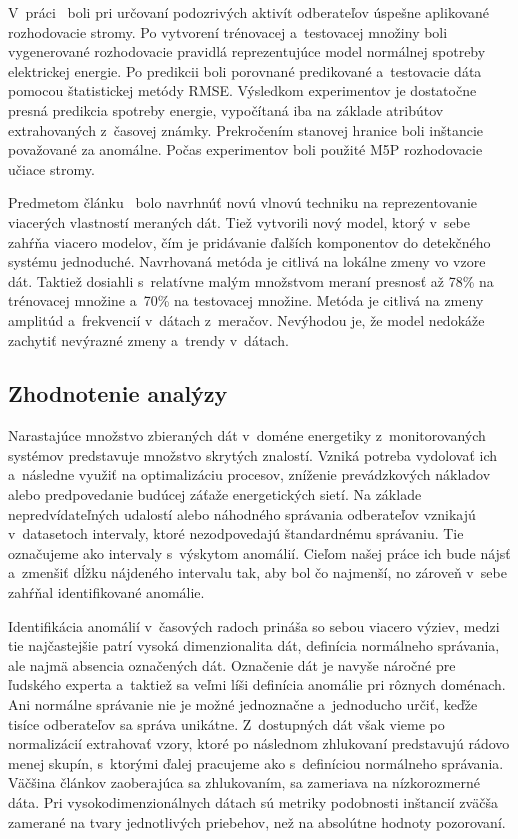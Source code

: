 \documentclass[a4paper,twoside,slovak,12pt,appendix]{article}
\begin{document}
\noindent
V~práci~\cite{Cody2015} boli pri určovaní podozrivých aktivít odberateľov
úspešne aplikované rozhodovacie stromy. Po vytvorení trénovacej a~testovacej
množiny boli vygenerované rozhodovacie pravidlá reprezentujúce model normálnej
spotreby elektrickej energie. Po predikcii boli porovnané predikované
a~testovacie dáta pomocou štatistickej metódy RMSE. Výsledkom experimentov je
dostatočne presná predikcia spotreby energie, vypočítaná iba na základe
atribútov extrahovaných z~časovej známky. Prekročením stanovej hranice boli
inštancie považované za anomálne. Počas experimentov boli použité M5P
rozhodovacie učiace stromy.
\medskip

\noindent
Predmetom článku~\cite{Tagaris2002} bolo navrhnúť novú vlnovú techniku na
reprezentovanie viacerých vlastností meraných dát. Tiež vytvorili nový model,
ktorý v~sebe zahŕňa viacero modelov, čím je pridávanie ďalších komponentov do
detekčného systému jednoduché. Navrhovaná metóda je citlivá na lokálne zmeny vo
vzore dát. Taktiež dosiahli s~relatívne malým množstvom meraní presnosť až 78\%
na trénovacej množine a~70\% na testovacej množine. Metóda je citlivá na zmeny
amplitúd a~frekvencií v~dátach z~meračov. Nevýhodou je, že model nedokáže
zachytiť nevýrazné zmeny a~trendy v~dátach.
\medskip


\subsection{Zhodnotenie analýzy}
Narastajúce množstvo zbieraných dát v~doméne energetiky z~monitorovaných
systémov predstavuje množstvo skrytých znalostí. Vzniká potreba vydolovať ich
a~následne využiť na optimalizáciu procesov, zníženie prevádzkových nákladov
alebo predpovedanie budúcej záťaže energetických sietí. Na základe
nepredvídateľných udalostí alebo náhodného správania odberateľov vznikajú
v~datasetoch intervaly, ktoré nezodpovedajú štandardnému správaniu. Tie
označujeme ako intervaly s~výskytom anomálií. Cieľom našej práce ich bude nájsť
a~zmenšiť dĺžku nájdeného intervalu tak, aby bol čo najmenší, no zároveň v~sebe
zahŕňal identifikované anomálie.

Identifikácia anomálií v~časových radoch prináša so sebou viacero výziev, medzi
tie najčastejšie patrí vysoká dimenzionalita dát, definícia normálneho správania,
ale najmä absencia označených dát. Označenie dát je navyše náročné pre ľudského
experta a~taktiež sa veľmi líši definícia anomálie pri rôznych doménach. Ani
normálne správanie nie je možné jednoznačne a~jednoducho určiť, keďže tisíce
odberateľov sa správa unikátne. Z~dostupných dát však vieme po normalizácií
extrahovať vzory, ktoré po následnom zhlukovaní predstavujú rádovo menej skupín,
s~ktorými ďalej pracujeme ako s~definíciou normálneho správania. Väčšina článkov
zaoberajúca sa zhlukovaním, sa zameriava na nízkorozmerné dáta. Pri
vysokodimenzionálnych dátach sú metriky podobnosti inštancií zväčša zamerané na
tvary jednotlivých priebehov, než na absolútne hodnoty pozorovaní.
\end{document}
